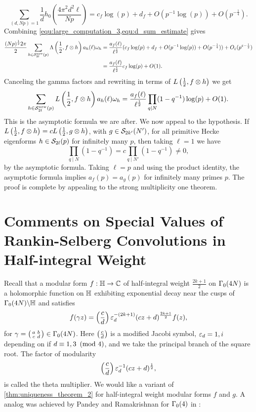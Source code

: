 \documentclass[12pt,reqno,oneside]{amsart}
\begin{document}
    \begin{equation}\label{equ:d_sum_estimate}
        \sum_{(d,Np) = 1}\frac{1}{d}h_{0}\left(\frac{4\pi^{2}d^{2}\ell}{Np}\right) = c_{f}\log(p)+d_{f}+O(p^{-1}\log(p))+O(p^{-\frac{1}{4}}).
    \end{equation}
    Combining \cref{equ:large_computation_3,equ:d_sum_estimate} gives
    \begin{align*}
        \frac{(Np)^{\frac{1}{2}}2\pi}{2}\sum_{h \in \mathcal{S}_{2l}^{\text{new}}(p)}\Lambda\left(\frac{1}{2},f \otimes h\right)a_{h}(\ell)\omega_{h} &= \frac{a_{f}(\ell)}{\ell^{\frac{1}{2}}}(c_{f}\log(p)+d_{f}+O(p^{-1}\log(p))+O(p^{-\frac{1}{4}}))+O_{\varepsilon}(p^{\varepsilon-\frac{1}{2}}) \\
        &= \frac{a_{f}(\ell)}{\ell^{\frac{1}{2}}}c_{f}\log(p)+O(1).
    \end{align*}
    Canceling the gamma factors and rewriting in terms of $L\left(\frac{1}{2},f \otimes h\right)$ we get
    \[
        \sum_{h \in \mathcal{S}_{2l}^{\text{new}}(p)}L\left(\frac{1}{2},f \otimes h\right)a_{h}(\ell)\omega_{h} = \frac{a_{f}(\ell)}{\ell^{\frac{1}{2}}}\prod_{q \mid N}(1-q^{-1})\log(p)+O(1).
    \]
    This is the asymptotic formula we are after. We now appeal to the hypothesis. If $L\left(\frac{1}{2},f \otimes h\right) = cL\left(\frac{1}{2},g \otimes h\right)$, with $g \in \mathcal{S}_{2k'}(N')$, for all primitive Hecke eigenforms $h \in \mathcal{S}_{2l}(p)$ for infinitely many $p$, then taking $\ell = 1$ we have
    \[
        \prod_{q \mid N}(1-q^{-1}) = c\prod_{q \mid N'}(1-q^{-1}) \neq 0,
    \]
    by the asymptotic formula. Taking $\ell = p$ and using the product identity, the asymptotic formula implies $a_{f}(p) = a_{g}(p)$ for infinitely many primes $p$. The proof is complete by appealing to the strong multiplicity one theorem.
\section{Comments on Special Values of Rankin-Selberg Convolutions in Half-integral Weight}
    Recall that a modular form $f:\mathbb{H} \to \mathbb{C}$ of half-integral weight $\frac{2k+1}{2}$ on $\Gamma_{0}(4N)$ is a holomorphic function on $\mathbb{H}$ exhibiting exponential decay near the cusps of $\Gamma_{0}(4N)\backslash\mathbb{H}$ and satisfies
    \[
        f(\gamma z) = \left(\frac{c}{d}\right)\varepsilon_{d}^{-(2k+1)}(cz+d)^{\frac{2k+1}{2}}f(z),
    \]
    for $\gamma = \begin{psmallmatrix} a & b \\ c & d \end{psmallmatrix} \in \Gamma_{0}(4N)$. Here $\left(\frac{c}{d}\right)$ is a modified Jacobi symbol, $\varepsilon_{d} = 1,i$ depending on if $d \equiv 1,3 \ \left(\text{mod }4\right)$, and we take the principal branch of the square root. The factor of modularity
    \[
        \left(\frac{c}{d}\right)\varepsilon_{d}^{-1}(cz+d)^{\frac{1}{2}},
    \]
    is called the theta multiplier. We would like a variant of \cref{thm:uniqueness_theorem_2} for half-integral weight modular forms $f$ and $g$. A analog was achieved by Pandey and Ramakrishnan for $\Gamma_{0}(4)$ in \cite{PR}:
\end{document}
